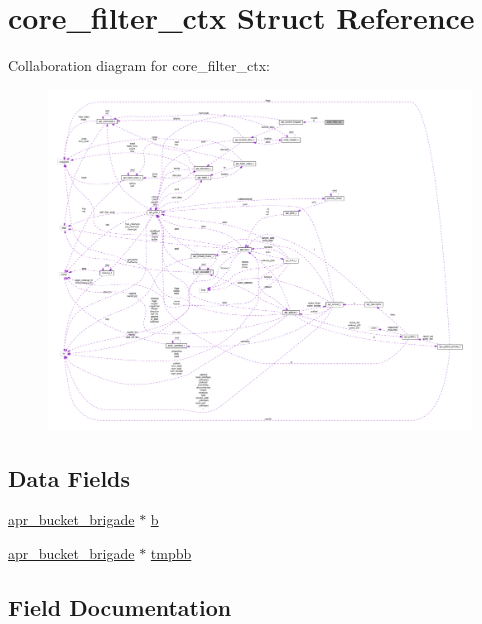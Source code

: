 \hypertarget{structcore__filter__ctx}{}\section{core\+\_\+filter\+\_\+ctx Struct Reference}
\label{structcore__filter__ctx}


Collaboration diagram for core\+\_\+filter\+\_\+ctx\+:
\nopagebreak
\begin{figure}[H]
\begin{center}
\leavevmode
\includegraphics[width=350pt]{structcore__filter__ctx__coll__graph}
\end{center}
\end{figure}
\subsection*{Data Fields}
\begin{DoxyCompactItemize}
\item 
\hyperlink{structapr__bucket__brigade}{apr\+\_\+bucket\+\_\+brigade} $\ast$ \hyperlink{structcore__filter__ctx_ab083b63e4b9c6f6a8b722fefd6e18da3}{b}
\item 
\hyperlink{structapr__bucket__brigade}{apr\+\_\+bucket\+\_\+brigade} $\ast$ \hyperlink{structcore__filter__ctx_ad7fcd6257894c70855b5b43c6f84c453}{tmpbb}
\end{DoxyCompactItemize}


\subsection{Field Documentation}
